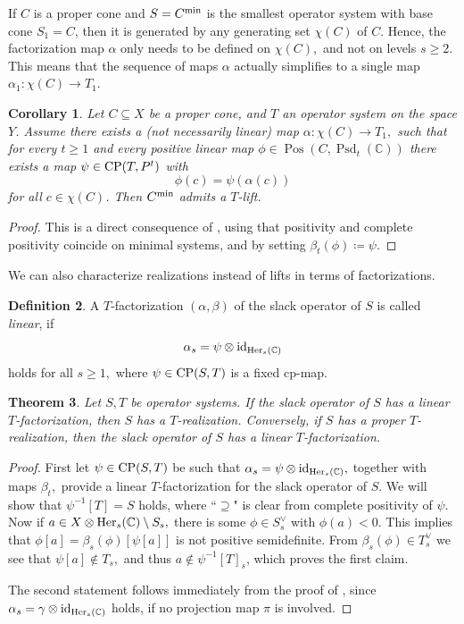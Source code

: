 \documentclass[11pt,onecolumn]{article}
\theoremstyle{plain}
\newtheorem{theorem}{Theorem}[section]
\newtheorem{corollary}[theorem]{Corollary}
\theoremstyle{definition}
\newtheorem{definition}[theorem]{Definition}
\newcommand{\C}{\mathbb{C}}
\begin{document}
If \(C\) is a proper cone and \(S = C^\textnormal{min}\) is the smallest operator system with base cone \(S_1=C\), then it is generated by any generating set \(\chi(C)\) of \(C\). Hence, the factorization map \(\alpha\) only needs to be defined on \(\chi(C),\) and not on levels \(s \geqslant 2\). This means that the sequence of maps \(\alpha\) actually simplifies to a single map \(\alpha_1\colon \chi(C) \to T_1\).

\begin{corollary}
\label{cor:minlift}
	Let \(C\subseteq X\) be a proper cone, and \(T\) an operator system on the space $Y$. Assume there exists a (not necessarily linear) map \(\alpha\colon \chi(C) \to T_1,\) such that for every \(t\geqslant 1\) and every positive linear map \(\phi \in \operatorname{Pos}(C, \operatorname{Psd}_t(\C))\) there exists a map \(\psi \in {\rm CP}(T, P^t)\) with \[\phi(c) = \psi(\alpha(c))\] for all \(c \in \chi(C)\). Then \(C^\textnormal{min}\) admits a \(T\)-lift.
\end{corollary}
\begin{proof}
    This is a direct consequence of , using that positivity and complete positivity coincide  on minimal systems, and by setting $\beta_t(\phi)\coloneqq \psi.$
\end{proof}

We can also characterize realizations instead of lifts in terms of factorizations.

\begin{definition}
    A $T$-factorization $(\alpha,\beta)$ of the slack operator of $S$ is called {\it linear}, if $$\alpha_s=\psi\otimes{\rm id}_{{\rm Her}_s(\C)}$$ holds for all $s\geqslant 1,$ where $\psi\in{\rm CP}(S,T)$ is a fixed cp-map. 
\end{definition}

\begin{theorem}\label{thm:factlift2}Let $S,T$ be operator systems. 
If the slack operator of $S$ has a linear $T$-factorization, then $S$ has a $T$-realization.
Conversely, if $S$ has a proper $T$-realization, then the slack operator of $S$ has a linear $T$-factorization.
\end{theorem}
\begin{proof}
First let $\psi\in{\rm CP}(S,T)$ be such that $\alpha_s=\psi\otimes{\rm id}_{{\rm Her}_s(\mathbb C)},$ together with maps $\beta_t,$ provide a linear $T$-factorization for the slack operator of $S$. We will show that $\psi^{-1}[T]=S$ holds, where ``$\supseteq$" is clear from complete positivity of $\psi$. Now if $a\in X\otimes{\rm Her}_s(\mathbb C)\setminus S_s,$ there is some $\phi\in S^\vee_s$ with $\phi(a)<0.$ This implies that $\phi[a]=\beta_s(\phi)[\psi[a]]$ is not positive semidefinite. From $\beta_s(\phi)\in T^\vee_s$ we see that $\psi[a]\notin T_s,$ and thus $a\notin\psi^{-1}[T]_s$, which proves the first claim. 

The second statement follows immediately from the proof of , since $\alpha_s=\gamma\otimes{\rm id}_{{\rm Her}_s(\mathbb C)}$ holds, if no projection map $\pi$ is involved. 
\end{proof}
\end{document}
